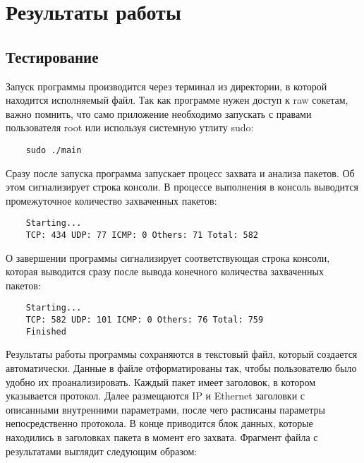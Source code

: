 \section{Результаты работы}
\label{sec:result}

\subsection{Тестирование}

Запуск программы производится через терминал из директории, в которой
находится исполняемый файл. Так как программе нужен доступ к raw сокетам, 
важно помнить, что само приложение необходимо запускать с правами пользователя 
root\cite{linux} или используя системную утлиту sudo:
\begin{verbatim}
    sudo ./main
\end{verbatim}
Сразу после запуска программа запускает процесс захвата и анализа
пакетов. Об этом сигнализирует строка консоли. В процессе выполнения в
консоль выводится промежуточное количество захваченных пакетов:
\begin{verbatim}
    Starting...
    TCP: 434 UDP: 77 ICMP: 0 Others: 71 Total: 582
\end{verbatim}
О завершении программы сигнализирует соответствующая строка
консоли, которая выводится сразу после вывода конечного количества
захваченных пакетов:
\begin{verbatim}
    Starting...
    TCP: 582 UDP: 101 ICMP: 0 Others: 76 Total: 759
    Finished
\end{verbatim}
Результаты работы программы сохраняются в текстовый файл, который
создается автоматически. Данные в файле отформатированы так, чтобы
пользователю было удобно их проанализировать. Каждый пакет имеет
заголовок, в котором указывается протокол. Далее размещаются IP и Ethernet
заголовки с описанными внутренними параметрами, после чего расписаны
параметры непосредственно протокола. В конце приводится блок данных,
которые находились в заголовках пакета в момент его захвата. Фрагмент файла
с результатами выглядит следующим образом:
\footnotesize
